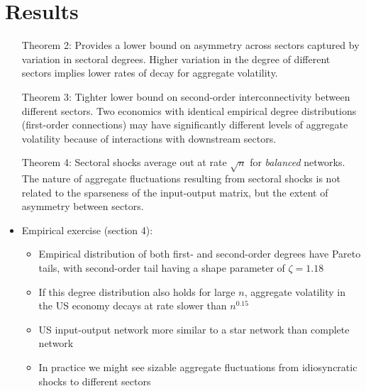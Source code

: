 \section{Results}
\begin{itemize}
\item[Theorem 2:] Provides a lower bound on asymmetry across sectors captured by variation in sectoral degrees. Higher variation in the degree of different sectors implies lower rates of decay for aggregate volatility.
  \item[Theorem 3:] Tighter lower bound on second-order interconnectivity between different sectors. Two economics with identical empirical degree distributions (first-order connections) may have significantly different levels of aggregate volatility because of interactions with downstream sectors.
    \item[Theorem 4:] Sectoral shocks average out at rate $\sqrt{n}$ for \emph{balanced} networks. The nature of aggregate fluctuations resulting from sectoral shocks is not related to the sparseness of the input-output matrix, but the extent of asymmetry between sectors.
    \item Empirical exercise (section 4):
      \begin{itemize}
      \item Empirical distribution of both first- and second-order degrees have Pareto tails, with second-order tail having a shape parameter of $\zeta = 1.18$
      \item If this degree distribution also holds for large $n$, aggregate volatility in the US economy decays at rate slower than $n^{0.15}$
      \item US input-output network more similar to a star network than complete network
        \item In practice we might see sizable aggregate fluctuations from idiosyncratic shocks to different sectors
      \end{itemize}
\end{itemize}

